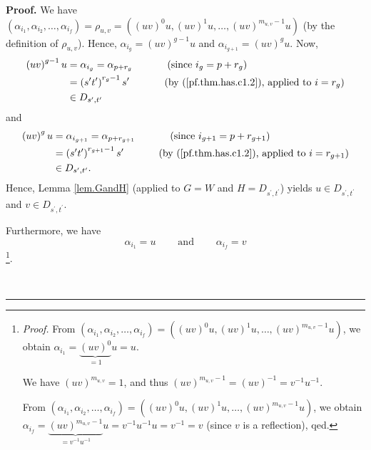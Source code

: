 \documentclass[numbers=enddot,12pt,final,onecolumn,notitlepage,abstracton]{scrartcl}%
\theoremstyle{definition}
\newenvironment{proof}[1][Proof]{\noindent\textbf{#1.} }{\ \rule{0.5em}{0.5em}}
\begin{document}
\begin{proof}
We have $\left(  \alpha_{i_{1}},\alpha_{i_{2}},\ldots,\alpha_{i_{f}}\right)
=\rho_{u,v}=\left(  \left(  uv\right)  ^{0}u,\left(  uv\right)  ^{1}%
u,\ldots,\left(  uv\right)  ^{m_{u,v}-1}u\right)  $ (by the definition of
$\rho_{u,v}$). Hence, $\alpha_{i_{g}}=\left(  uv\right)  ^{g-1}u$ and
$\alpha_{i_{g+1}}=\left(  uv\right)  ^{g}u$. Now,%
\begin{align*}
\left(  uv\right)  ^{g-1}u  &  =\alpha_{i_{g}}=\alpha_{p+r_{g}}%
\ \ \ \ \ \ \ \ \ \ \left(  \text{since }i_{g}=p+r_{g}\right) \\
&  =\left(  s^{\prime}t^{\prime}\right)  ^{r_{g}-1}s^{\prime}%
\ \ \ \ \ \ \ \ \ \ \left(  \text{by (\ref{pf.thm.has.c1.2}), applied to
}i=r_{g}\right) \\
&  \in D_{s^{\prime},t^{\prime}}%
\end{align*}
and%
\begin{align*}
\left(  uv\right)  ^{g}u  &  =\alpha_{i_{g+1}}=\alpha_{p+r_{g+1}%
}\ \ \ \ \ \ \ \ \ \ \left(  \text{since }i_{g+1}=p+r_{g+1}\right) \\
&  =\left(  s^{\prime}t^{\prime}\right)  ^{r_{g+1}-1}s^{\prime}%
\ \ \ \ \ \ \ \ \ \ \left(  \text{by (\ref{pf.thm.has.c1.2}), applied to
}i=r_{g+1}\right) \\
&  \in D_{s^{\prime},t^{\prime}}.
\end{align*}
Hence, Lemma \ref{lem.GandH} (applied to $G=W$ and $H=D_{s^{\prime},t^{\prime
}}$) yields $u\in D_{s^{\prime},t^{\prime}}$ and $v\in D_{s^{\prime}%
,t^{\prime}}$.

Furthermore, we have%
\[
\alpha_{i_{1}}=u\ \ \ \ \ \ \ \ \ \ \text{and}\ \ \ \ \ \ \ \ \ \ \alpha
_{i_{f}}=v
\]
\footnote{\textit{Proof.} From $\left(  \alpha_{i_{1}},\alpha_{i_{2}}%
,\ldots,\alpha_{i_{f}}\right)  =\left(  \left(  uv\right)  ^{0}u,\left(
uv\right)  ^{1}u,\ldots,\left(  uv\right)  ^{m_{u,v}-1}u\right)  $, we obtain
$\alpha_{i_{1}}=\underbrace{\left(  uv\right)  ^{0}}_{=1}u=u$.
\par
We have $\left(  uv\right)  ^{m_{u,v}}=1$, and thus $\left(  uv\right)
^{m_{u,v}-1}=\left(  uv\right)  ^{-1}=v^{-1}u^{-1}$.
\par
From $\left(  \alpha_{i_{1}},\alpha_{i_{2}},\ldots,\alpha_{i_{f}}\right)
=\left(  \left(  uv\right)  ^{0}u,\left(  uv\right)  ^{1}u,\ldots,\left(
uv\right)  ^{m_{u,v}-1}u\right)  $, we obtain $\alpha_{i_{f}}%
=\underbrace{\left(  uv\right)  ^{m_{u,v}-1}}_{=v^{-1}u^{-1}}u=v^{-1}%
u^{-1}u=v^{-1}=v$ (since $v$ is a reflection), qed.}.


\end{proof}
\end{document}
